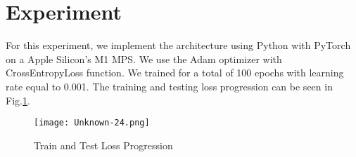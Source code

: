\documentclass{article}
\begin{document}
\section{Experiment}
For this experiment, we implement the architecture using Python with PyTorch on a Apple Silicon's M1 MPS. We use the Adam optimizer with CrossEntropyLoss function. We trained for a total of 100 epochs with learning rate equal to 0.001. The training and testing loss progression can be seen in Fig.\ref{fig:loss}.
\begin{figure}
    \centering
    \texttt{[image: Unknown-24.png]}
    \caption{Train and Test Loss Progression}
    \label{fig:loss}
\end{figure}
\end{document}
